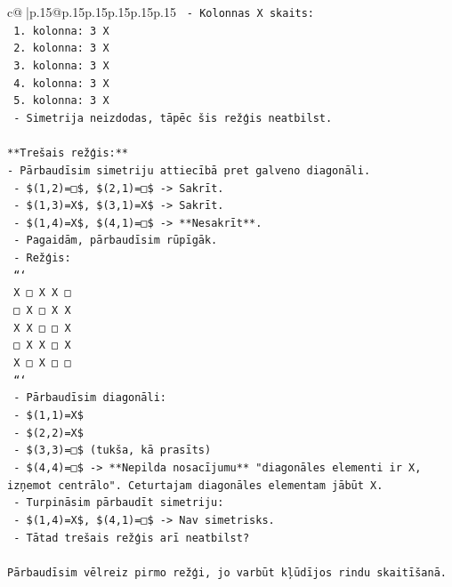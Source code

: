 \documentclass{article}
\begin{document}
{\begin{supertabular}{c@{$\;$}|p{.15\linewidth}@{}p{.15\linewidth}p{.15\linewidth}p{.15\linewidth}p{.15\linewidth}p{.15\linewidth}}
{{{\texttt{  {-} Kolonnas X skaits:} \\
\texttt{    1. kolonna: 3 X} \\
\texttt{    2. kolonna: 3 X} \\
\texttt{    3. kolonna: 3 X} \\
\texttt{    4. kolonna: 3 X} \\
\texttt{    5. kolonna: 3 X} \\
\texttt{  {-} Simetrija neizdodas, tāpēc šis režģis neatbilst.} \\
\\ 
\texttt{**Trešais režģis:**} \\
\texttt{{-} Pārbaudīsim simetriju attiecībā pret galveno diagonāli.} \\
\texttt{  {-} \$(1,2)=□\$, \$(2,1)=□\$ {-}> Sakrīt.} \\
\texttt{  {-} \$(1,3)=X\$, \$(3,1)=X\$ {-}> Sakrīt.} \\
\texttt{  {-} \$(1,4)=X\$, \$(4,1)=□\$ {-}> **Nesakrīt**.} \\
\texttt{  {-} Pagaidām, pārbaudīsim rūpīgāk.} \\
\texttt{  {-} Režģis:} \\
\texttt{    ```} \\
\texttt{    X □ X X □} \\
\texttt{    □ X □ X X} \\
\texttt{    X X □ □ X} \\
\texttt{    □ X X □ X} \\
\texttt{    X □ X □ □} \\
\texttt{    ```} \\
\texttt{  {-} Pārbaudīsim diagonāli:} \\
\texttt{    {-} \$(1,1)=X\$} \\
\texttt{    {-} \$(2,2)=X\$} \\
\texttt{    {-} \$(3,3)=□\$ (tukša, kā prasīts)} \\
\texttt{    {-} \$(4,4)=□\$ {-}> **Nepilda nosacījumu** "diagonāles elementi ir X, izņemot centrālo". Ceturtajam diagonāles elementam jābūt X.} \\
\texttt{  {-} Turpināsim pārbaudīt simetriju:} \\
\texttt{    {-} \$(1,4)=X\$, \$(4,1)=□\$ {-}> Nav simetrisks.} \\
\texttt{    {-} Tātad trešais režģis arī neatbilst?} \\
\\ 
\texttt{Pārbaudīsim vēlreiz pirmo režģi, jo varbūt kļūdījos rindu skaitīšanā.} \\
}}}
\end{supertabular}}
\end{document}

